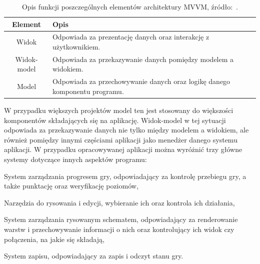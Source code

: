 \begin{table}[h]
    \centering
    \caption[Opis funkcji poszczególnych elementów architektury MVVM.]
    {Opis funkcji poszczególnych elementów architektury MVVM, źródło:~\cite{mvvm}.}
    \label{tab:mvvm}
    \begin{tabular}{|c|p{}|}
        \hline
        Element & Opis \\
        \hline
        \hline
        Widok & Odpowiada za prezentację danych oraz interakcję z użytkownikiem. \\
        \hline
        Widok-model & Odpowiada za przekazywanie danych pomiędzy modelem a widokiem. \\
        \hline
        Model & Odpowiada za przechowywanie danych oraz logikę danego komponentu programu. \\
        \hline
    \end{tabular}
\end{table}

W przypadku większych projektów model ten jest stosowany do większości komponentów składających się na aplikację.
Widok-model w tej sytuacji odpowiada za przekazywanie danych nie tylko między modelem a widokiem,
ale również pomiędzy innymi częściami aplikacji jako menedżer danego systemu aplikacji.
W przypadku opracowywanej aplikacji można wyróżnić trzy główne systemy dotyczące innych aspektów programu:

\begin{citemize}
    \item System zarządzania progresem gry, odpowiadający za kontrolę przebiegu gry,
    a także punktację oraz weryfikację poziomów,
    \item Narzędzia do rysowania i edycji, wybieranie ich oraz kontrola ich działania,
    \item System zarządzania rysowanym schematem,
    odpowiadający za renderowanie warstw i przechowywanie informacji o nich
    oraz kontrolujący ich widok czy połączenia, na jakie się składają,
    \item System zapisu, odpowiadający za zapis i odczyt stanu gry.
\end{citemize}

